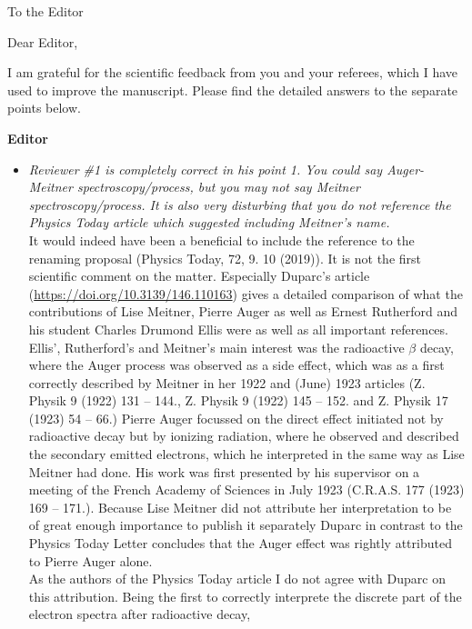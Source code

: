 \documentclass[DIN,pagenumber=false,parskip=half,fromalign=left,fromphone=false,fromemail=true,fromurl=false,fromlogo=false,fromrule=false]{scrlttr2}
\begin{document}
\begin{letter}{To the Editor}
	
	\opening{Dear Editor,}

I am grateful for the scientific feedback from you and your referees, which I
have used to improve the manuscript. Please find the detailed answers to the
separate points below.

\textbf{Editor}
\begin{itemize}
 \item \emph{Reviewer \#1 is completely correct in his point 1. You could say
             Auger-Meitner spectroscopy/process, but you may not say Meitner
             spectroscopy/process. It is also very disturbing that you do not reference
             the Physics Today article which suggested including Meitner's name.}\\
       It would indeed have been a beneficial to include the reference to the renaming
       proposal (Physics Today, 72, 9. 10 (2019)). It is not the first scientific
       comment on the matter. Especially Duparc's article
       (\url{https://doi.org/10.3139/146.110163}) gives a detailed comparison of what
       the contributions of Lise Meitner, Pierre Auger as well as Ernest Rutherford
       and his student Charles Drumond Ellis were as well as all important references.
       Ellis', Rutherford's and Meitner's main interest was the radioactive $\beta$ decay,
       where the Auger process was observed as a side effect, which was as a first
       correctly described by Meitner in her 1922 and (June) 1923 articles
       (Z. Physik 9 (1922) 131 – 144., Z. Physik 9 (1922) 145 – 152. and
       Z. Physik 17 (1923) 54 – 66.) Pierre Auger focussed on the direct effect
       initiated not by radioactive decay but by ionizing radiation, where he observed
       and described the
       secondary emitted electrons, which he interpreted in the same way as Lise Meitner
       had done. His work was first presented by his
       supervisor on a meeting of the French Academy of Sciences in July 1923
       (C.R.A.S. 177 (1923) 169 – 171.).
       Because Lise Meitner did not attribute her interpretation to be of great enough
       importance to publish it separately Duparc in contrast to the Physics Today Letter
       concludes that the Auger effect was rightly attributed to Pierre Auger alone.\\
       As the authors of the Physics Today article
       I do not agree with Duparc on this attribution. Being the first to correctly
       interprete the discrete part of the electron spectra after radioactive decay,

\end{itemize}
\end{letter}
\end{document}
